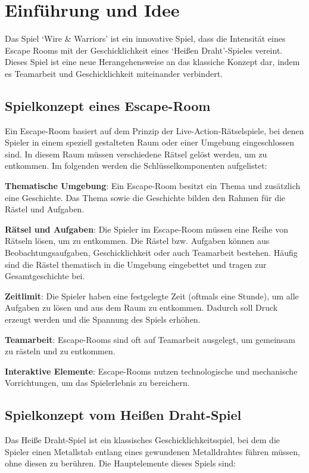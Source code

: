 \chapter{Einführung und Idee}

Das Spiel `Wire \& Warriors' ist ein innovative Spiel, dass die Intensität eines Escape Rooms mit der Geschicklichkeit eines `Heißen Draht'-Spieles vereint. Dieses Spiel ist eine neue Herangehensweise an das klassiche Konzept dar, indem es Teamarbeit und Geschicklichkeit miteinander verbindert.

\section{Spielkonzept eines Escape-Room}

Ein Escape-Room basiert auf dem Prinzip der Live-Action-Rätselspiele, bei denen Spieler in einem speziell gestalteten Raum oder einer Umgebung eingeschlossen sind. In diesem Raum müssen verschiedene Rätsel gelöst werden, um zu entkommen. Im folgenden werden die Schlüsselkomponenten aufgelistet:

\begin{compactitem}
 \item \textbf{Thematische Umgebung}: Ein Escape-Room besitzt ein Thema und zusätzlich eine Geschichte. Das Thema sowie die Geschichte bilden den Rahmen für die Rästel und Aufgaben.
 \item \textbf{Rätsel und Aufgaben}: Die Spieler im Escape-Room müssen eine Reihe von Rätseln lösen, um zu entkommen. Die Rästel bzw. Aufgaben können aus Beobachtungsaufgaben, Geschicklichkeit oder auch Teamarbeit bestehen. Häufig sind die Rästel thematisch in die Umgebung eingebettet und tragen zur Gesamtgeschichte bei.
 \item \textbf{Zeitlimit}: Die Spieler haben eine festgelegte Zeit (oftmals eine Stunde), um alle Aufgaben zu lösen und aus dem Raum zu entkommen. Dadurch soll Druck erzeugt werden und die Spannung des Spiels erhöhen.
 \item \textbf{Teamarbeit}: Escape-Rooms sind oft auf Teamarbeit ausgelegt, um gemeinsam zu rästeln und zu entkommen.
 \item \textbf{Interaktive Elemente}: Escape-Rooms nutzen technologische und mechanische Vorrichtungen, um das Spielerlebnis zu bereichern.
\end{compactitem}

\section{Spielkonzept vom Heißen Draht-Spiel}
Das Heiße Draht-Spiel ist ein klassisches Geschicklichkeitsspiel, bei dem die Spieler einen Metallstab entlang eines gewundenen Metalldrahtes führen müssen, ohne diesen zu berühren. Die Hauptelemente dieses Spiels sind:

